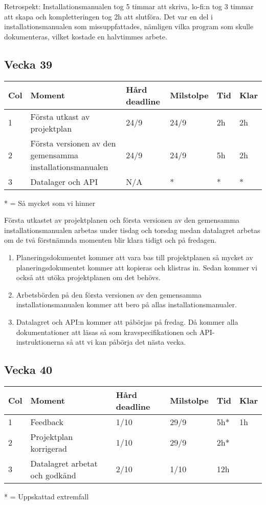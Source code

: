 \documentclass{TDP003mall}
\begin{document}
Retrospekt: Installationsmanualen tog 5 timmar att skriva, lo-fi:n tog 3 timmar  att skapa och kompletteringen tog 2h att slutföra. Det var en del i installationsmanualen som missuppfattades, nämligen vilka program som skulle dokumenteras, vilket kostade en halvtimmes arbete.

\subsection*{Vecka 39}
\begin{table}[!h]
\begin{tabularx}{\linewidth}{|l|X|l|l|l|l|}
\hline
Col & Moment & Hård deadline & Milstolpe & Tid & Klar \\\hline
1 & Första utkast av projektplan & 24/9 & 24/9 & 2h & 2h \\\hline
2 & Första versionen av den gemensamma installationsmanualen & 24/9 & 24/9 & 5h & 2h \\\hline
3 & Datalager och API & N/A & * & * & *\\\hline
\end{tabularx}
\end{table}
* = Så mycket som vi hinner

Första utkastet av projektplanen och första versionen av den gemensamma installationsmanualen arbetas under tisdag och torsdag medan datalagret arbetas om de två förstnämnda momenten blir klara tidigt och på fredagen.

\begin{enumerate}
\item
  Planeringsdokumentet kommer att vara bas till projektplanen så mycket av planeringsdokumentet kommer att kopieras och klistras in. Sedan kommer vi också att utöka projektplanen om det behövs.

\item
  Arbetsbörden på den första versionen av den gemensamma installationsmanualen kommer att bero på allas installationsmanualer.

\item
  Datalagret och API:n kommer att påbörjas på fredag. Då kommer alla dokumentationer att läsas så som kravspecifikationen och API-instruktionerna så att vi kan påbörja det nästa vecka.
\end{enumerate}

\subsection*{Vecka 40}
\begin{table}[!h]
\begin{tabularx}{\linewidth}{|l|X|l|l|l|l|}
\hline
Col & Moment & Hård deadline & Milstolpe & Tid & Klar \\\hline
1 & Feedback & 1/10 & 29/9 & 5h* & 1h \\\hline
2 & Projektplan korrigerad & 1/10 & 29/9 & 2h* & \\\hline
3 & Datalagret arbetat och godkänd & 2/10 & 1/10 & 12h & \\\hline
\end{tabularx}
\end{table}
* = Uppskattad extremfall
\end{document}
